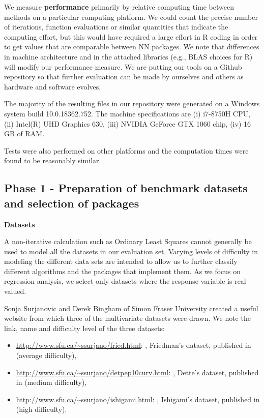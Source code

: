 We measure \textbf{performance} primarily by relative computing time
between methods on a particular computing platform. We could count the
precise number of iterations, function evaluations or similar quantities
that indicate the computing effort, but this would have required a large
effort in \textsf{R} coding in order to get values that are comparable
between NN packages. We note that differences in machine architecture
and in the attached libraries (e.g., BLAS choices for R) will modify our
performance measure. We are putting our tools on a Github repository so
that further evaluation can be made by ourselves and others as hardware
and software evolves.

The majority of the resulting files in our repository were generated on
a Windows system build 10.0.18362.752. The machine specifications are
(i) i7-8750H CPU, (ii) Intel(R) UHD Graphics 630, (iii) NVIDIA GeForce
GTX 1060 chip, (iv) 16 GB of RAM.

Tests were also performed on other platforms and the computation times
were found to be reasonably similar.

\hypertarget{phase-1---preparation-of-benchmark-datasets-and-selection-of-packages}{%
\subsection{Phase 1 - Preparation of benchmark datasets and selection of
packages}\label{phase-1---preparation-of-benchmark-datasets-and-selection-of-packages}}

\textbf{Datasets}

A non-iterative calculation such as Ordinary Least Squares cannot
generally be used to model all the datasets in our evaluation set.
Varying levels of difficulty in modeling the different data sets are
intended to allow us to further classify different algorithms and the
packages that implement them. As we focus on regression analysis, we
select only datasets where the response variable is real-valued.

Sonja Surjanovic and Derek Bingham of Simon Fraser University created a
useful website from which three of the multivariate datasets were drawn.
We note the link, name and difficulty level of the three datasets:

\begin{itemize}
\tightlist
\item
  \url{http://www.sfu.ca/~ssurjano/fried.html}: ,
  Friedman's dataset, published in \citep{friedman91} (average
  difficulty),\\
\item
  \url{http://www.sfu.ca/~ssurjano/detpep10curv.html}: ,
  Dette's dataset, published in \citep{dettePepelyshev10} (medium
  difficulty),\\
\item
  \url{http://www.sfu.ca/~ssurjano/ishigami.html}: ,
  Ishigami's dataset, published in \citep{ishigamietal90} (high
  difficulty).
\end{itemize}

